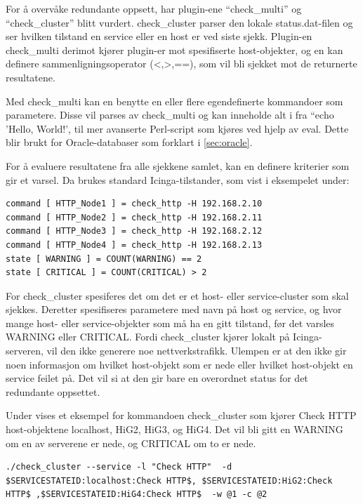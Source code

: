 For å overvåke redundante oppsett, har plugin-ene ``check\_multi'' \cite{checkmulti} og ``check\_cluster'' \cite{checkcluster} blitt vurdert. check\_cluster parser den lokale status.dat-filen og ser hvilken tilstand en service eller en host er ved siste sjekk. Plugin-en check\_multi derimot kjører plugin-er mot spesifiserte host-objekter, og en kan definere sammenligningsoperator (<,>,==), som vil bli sjekket mot de returnerte resultatene.

Med check\_multi kan en benytte en eller flere egendefinerte kommandoer som parametere. Disse vil parses av check\_multi og kan inneholde alt i fra ``echo 'Hello, World!', til mer avanserte Perl-script som kjøres ved hjelp av eval. Dette blir brukt for Oracle-databaser som forklart i \ref{sec:oracle}. 

For å evaluere resultatene fra alle sjekkene samlet, kan en definere kriterier som gir et varsel. Da brukes standard Icinga-tilstander, som vist i eksempelet under:
\begin{lstlisting}[style=example]
command [ HTTP_Node1 ] = check_http -H 192.168.2.10
command [ HTTP_Node2 ] = check_http -H 192.168.2.11
command [ HTTP_Node3 ] = check_http -H 192.168.2.12
command [ HTTP_Node4 ] = check_http -H 192.168.2.13
state [ WARNING ] = COUNT(WARNING) == 2
state [ CRITICAL ] = COUNT(CRITICAL) > 2
\end{lstlisting}
For check\_cluster spesiferes det om det er et host- eller service-cluster som skal sjekkes. Deretter spesifiseres parametere med navn på host og service, og hvor mange host- eller service-objekter som må ha en gitt tilstand, før det varsles WARNING eller CRITICAL. Fordi check\_cluster kjører lokalt på Icinga-serveren, vil den ikke generere noe nettverkstrafikk. Ulempen er at den ikke gir noen informasjon om hvilket host-objekt som er nede eller hvilket host-objekt en service feilet på. Det vil si at den gir bare en overordnet status for det redundante oppsettet. 

Under vises et eksempel for kommandoen check\_cluster som kjører Check HTTP host-objektene localhost, HiG2, HiG3, og HiG4. Det vil bli gitt en WARNING om en av serverene er nede, og CRITICAL om to er nede. 
\begin{lstlisting}[style=example]
./check_cluster --service -l "Check HTTP"  -d $SERVICESTATEID:localhost:Check HTTP$, $SERVICESTATEID:HiG2:Check HTTP$ ,$SERVICESTATEID:HiG4:Check HTTP$  -w @1 -c @2
\end{lstlisting}


